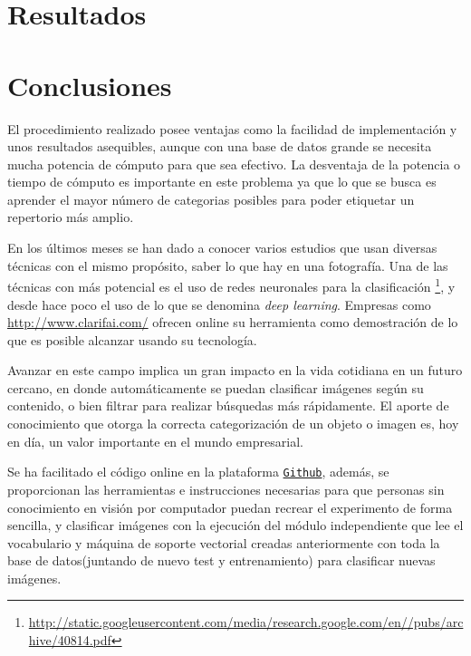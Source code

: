 \documentclass[a4paper,12pt]{article}
\begin{document}

\newpage
\section{Resultados}




\newpage
\section{Conclusiones}

El procedimiento realizado posee ventajas como la facilidad de implementación
y unos resultados asequibles, aunque con una base de datos grande se necesita
mucha potencia de cómputo para que sea efectivo. La desventaja de la potencia o 
tiempo de cómputo es importante en este problema ya que lo que se busca es 
aprender el mayor número de categorias posibles para poder etiquetar un 
repertorio más amplio. 

En los últimos meses se han dado a conocer varios estudios que usan diversas 
técnicas con el mismo propósito, saber lo que hay en una fotografía. Una de las
técnicas con más potencial es el uso de redes neuronales para la clasificación
\footnote{\url{http://static.googleusercontent.com/media/research.google.com/en//pubs/archive/40814.pdf}},
y desde hace poco el uso de lo que se denomina \emph{deep learning}. Empresas como
\url{http://www.clarifai.com/} ofrecen online su herramienta como demostración
de lo que es posible alcanzar usando su tecnología.

Avanzar en este campo implica un gran impacto en la vida cotidiana en un futuro
cercano, en donde automáticamente se puedan clasificar imágenes según su 
contenido, o bien filtrar para realizar búsquedas más rápidamente. El aporte de 
conocimiento que otorga la correcta categorización de un objeto o imagen es, 
hoy en día, un valor importante en el mundo empresarial. 

Se ha facilitado el código online en la plataforma
\href{https://github.com/DavidGasquez/category-recognition}{\texttt{Github}},
además, se  proporcionan las herramientas e instrucciones necesarias para que 
personas sin conocimiento en visión por computador puedan recrear el experimento 
de forma sencilla, y clasificar imágenes con la ejecución del módulo 
independiente que lee el vocabulario y máquina de soporte vectorial creadas 
anteriormente con toda la base de datos(juntando de nuevo test y entrenamiento)
para clasificar nuevas imágenes.
\end{document}
